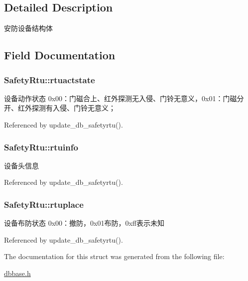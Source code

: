 \subsection{Detailed Description}
安防设备结构体 

\subsection{Field Documentation}
\hypertarget{structSafetyRtu_a43fd8e2a562fea9a6ea5a7fe57fec7af}{
\subsubsection[{rtuactstate}]{ Safety\-Rtu\-::rtuactstate}}\label{structSafetyRtu_a43fd8e2a562fea9a6ea5a7fe57fec7af}


设备动作状态 0x00：门磁合上、红外探测无入侵、门铃无意义，0x01：门磁分开、红外探测有入侵、门铃无意义； 



Referenced by update\-\_\-db\-\_\-safetyrtu().

\hypertarget{structSafetyRtu_a961d9d1c9a8c9082f6cd8bcc8b3292a4}{
\subsubsection[{rtuinfo}]{ Safety\-Rtu\-::rtuinfo}}\label{structSafetyRtu_a961d9d1c9a8c9082f6cd8bcc8b3292a4}


设备头信息 



Referenced by update\-\_\-db\-\_\-safetyrtu().

\hypertarget{structSafetyRtu_aa857a3b46e71c67a4d9c7bb83e34ffc0}{
\subsubsection[{rtuplace}]{ Safety\-Rtu\-::rtuplace}}\label{structSafetyRtu_aa857a3b46e71c67a4d9c7bb83e34ffc0}


设备布防状态 0x00：撤防，0x01布防，0xff表示未知 



Referenced by update\-\_\-db\-\_\-safetyrtu().



The documentation for this struct was generated from the following file\-:\begin{DoxyCompactItemize}
\item 
\hyperlink{dbbase_8h}{dbbase.\-h}\end{DoxyCompactItemize}
